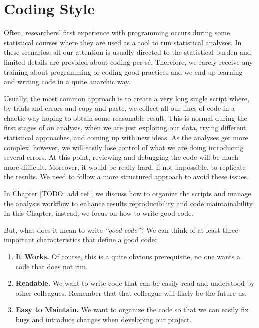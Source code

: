 \documentclass[
  11pt,
]{book}
\providecommand{\tightlist}{%
  \setlength{\itemsep}{0pt}\setlength{\parskip}{0pt}}
\begin{document}
\hypertarget{coding-style}{%
\section{Coding Style}\label{coding-style}}

Often, researchers' first experience with programming occurs during some statistical courses where they are used as a tool to run statistical analyses. In these scenarios, all our attention is usually directed to the statistical burden and limited details are provided about coding per sé. Therefore, we rarely receive any training about programming or coding good practices and we end up learning and writing code in a quite anarchic way.

Usually, the most common approach is to create a very long single script where, by trials-and-errors and copy-and-paste, we collect all our lines of code in a chaotic way hoping to obtain some reasonable result. This is normal during the first stages of an analysis, when we are just exploring our data, trying different statistical approaches, and coming up with new ideas. As the analyses get more complex, however, we will easily lose control of what we are doing introducing several errors. At this point, reviewing and debugging the code will be much more difficult. Moreover, it would be really hard, if not impossible, to replicate the results. We need to follow a more structured approach to avoid these issues.

In Chapter {[}TODO: add ref{]}, we discuss how to organize the scripts and manage the analysis workflow to enhance results reproducibility and code maintainability. In this Chapter, instead, we focus on how to write good code.

But, what does it mean to write \emph{``good code''}? We can think of at least three important characteristics that define a good code:

\begin{enumerate}
\def\labelenumi{\arabic{enumi}.}
\tightlist
\item
  \textbf{It Works.} Of course, this is a quite obvious prerequisite, no one wants a code that does not run.
\item
  \textbf{Readable.} We want to write code that can be easily read and understood by other colleagues. Remember that that colleague will likely be the future us.
\item
  \textbf{Easy to Maintain.} We want to organize the code so that we can easily fix bugs and introduce changes when developing our project.
\end{enumerate}
\end{document}
